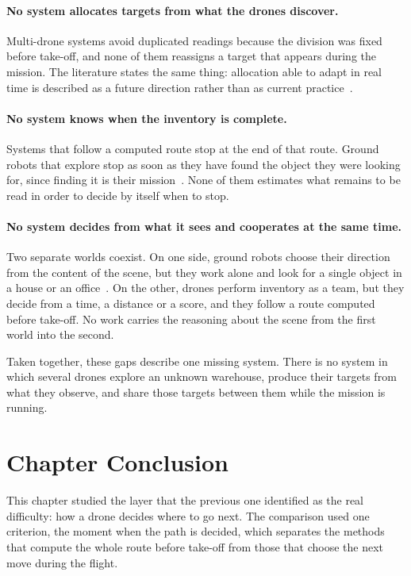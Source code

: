 \paragraph{No system allocates targets from what the drones discover.}
Multi-drone systems avoid duplicated readings because the division was fixed
before take-off, and none of them reassigns a target that appears during the
mission. The literature states the same thing: allocation able to adapt in real
time is described as a future direction rather than as current
practice~\cite{kumar2025comprehensive}.

\paragraph{No system knows when the inventory is complete.} Systems that follow a
computed route stop at the end of that route. Ground robots that explore stop as
soon as they have found the object they were looking for, since finding it is
their mission~\cite{yokoyama2024vlfm}. None of them estimates what remains to be
read in order to decide by itself when to stop.

\paragraph{No system decides from what it sees and cooperates at the same time.}
Two separate worlds coexist. On one side, ground robots choose their direction
from the content of the scene, but they work alone and look for a single object
in a house or an office~\cite{yokoyama2024vlfm, yu2023l3mvn}. On the other,
drones perform inventory as a team, but they decide from a time, a distance or a
score, and they follow a route computed before take-off. No work carries the
reasoning about the scene from the first world into the second.

\bigskip

Taken together, these gaps describe one missing system. There is no system in
which several drones explore an unknown warehouse, produce their targets from
what they observe, and share those targets between them while the mission is
running.

\section{Chapter Conclusion}%
\label{sec:nav:conclusion}

This chapter studied the layer that the previous one identified as the real
difficulty: how a drone decides where to go next. The comparison used one
criterion, the moment when the path is decided, which separates the methods that
compute the whole route before take-off from those that choose the next move
during the flight.

